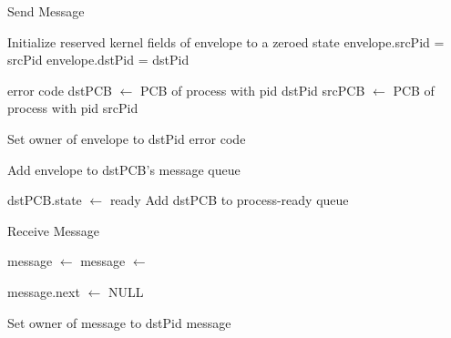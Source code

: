 \documentclass[12pt]{report}
\begin{document}
\begin{algorithm}
    \caption{Send Message}
    \label{code:send_message}
    \begin{algorithmic}[1]
            \State Initialize reserved kernel fields of envelope to a zeroed state
            \State envelope.srcPid = srcPid
            \State envelope.dstPid = dstPid

                \State \Return error code
            \EndIf
            \State dstPCB $\gets$ PCB of process with pid dstPid
            \State srcPCB $\gets$ PCB of process with pid srcPid

                \State Set owner of envelope to dstPid
            \Else
                \State \Return error code
            \EndIf

            \State Add envelope to dstPCB's message queue

             
                \State dstPCB.state $\gets$ ready
                \State Add dstPCB to process-ready queue
                    \State {} 
                \EndIf
            \EndIf
        \EndFunction
    \end{algorithmic}
\end{algorithm}

\begin{algorithm}
    \caption{Receive Message}
    \label{code:receive_message}
    \begin{algorithmic}[1]
            \State message $\gets$ 
             
                \State {} 
                \State message $\gets$ 
            \EndWhile

            \State {}

            \State message.next $\gets$ NULL

            \State Set owner of message to dstPid
            \State \Return message
        \EndFunction
    \end{algorithmic}
\end{algorithm}
\end{document}
